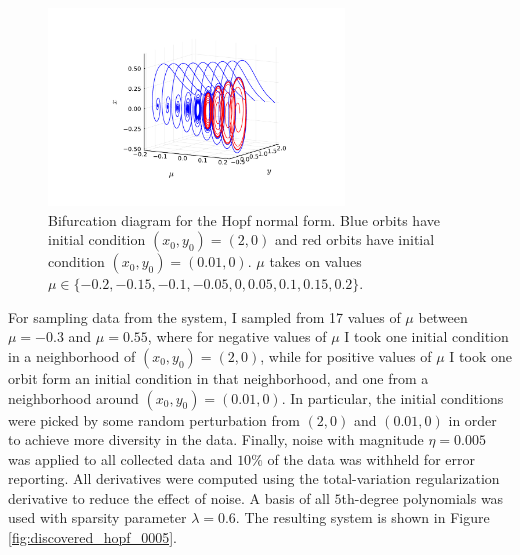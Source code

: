 \documentclass[10pt]{paper}
\begin{document}
\begin{figure}[h]
	\caption{Bifurcation diagram for the Hopf normal form. Blue orbits have initial condition $(x_0, y_0) = (2,0)$ and red orbits have initial condition $(x_0, y_0) = (0.01, 0)$. 
	$\mu$ takes on values $\mu \in \{-0.2, -0.15, -0.1, -0.05, 0, 0.05, 0.1, 0.15, 0.2 \}$.}
	\label{fig:hopf_normal_form}
	\centering 

	\includegraphics[width = 0.7\textwidth, trim={4.3cm, 2cm, 4.2cm, 3cm}, clip]{hopf_normal_actual.pdf}

\end{figure}
For sampling data from the system, I sampled from 17 values of $\mu$ between $\mu = -0.3$ and $\mu = 0.55$, where for negative values of $\mu$ I took one initial condition in a neighborhood of $(x_0, y_0) = (2, 0)$, while for positive values of $\mu$ I took one orbit form an initial condition in that neighborhood, and one from a neighborhood around $(x_0, y_0) = (0.01,0)$. In particular, the initial conditions were picked by some random perturbation from $(2,0)$ and $(0.01, 0)$ in order to achieve more diversity in the data. 
Finally, noise with magnitude $\eta = 0.005$ was applied to all collected data and $10\%$ of the data was withheld for error reporting.  
All derivatives were computed using the total-variation regularization derivative to reduce the effect of noise. A basis of all $5$th-degree polynomials was used with sparsity parameter $\lambda = 0.6$. The resulting system is shown in Figure \ref{fig:discovered_hopf_0005}.
\end{document}
